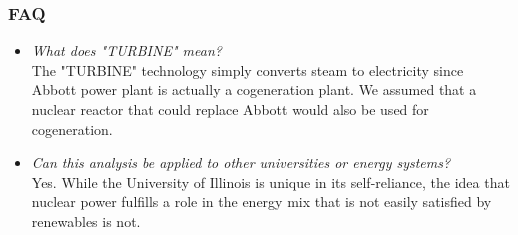 \documentclass[9pt]{beamer}
\begin{document}
\begin{frame}
  \frametitle{FAQ}
    \begin{itemize}
      \item \textit{What does "TURBINE" mean?}\\
      The "TURBINE" technology simply converts steam to electricity since Abbott
      power plant is actually a cogeneration plant. We assumed that a nuclear
      reactor that could replace Abbott would also be used for cogeneration.
      \item \textit{Can this analysis be applied to other universities or energy
      systems?}\\
      Yes. While the University of Illinois is unique in its self-reliance, the
      idea that nuclear power fulfills a role in the energy mix that is not easily
      satisfied by renewables is not.
    \end{itemize}
\end{frame}

\end{document}
